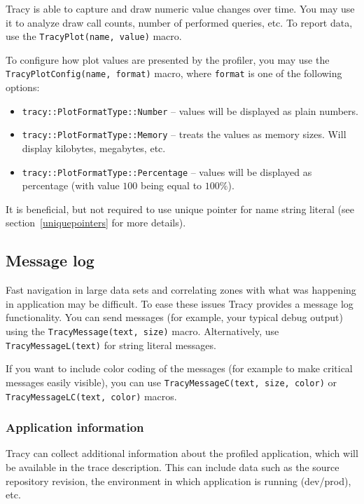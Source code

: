\documentclass[hidelinks,titlepage,a4paper]{article}
\begin{document}
Tracy is able to capture and draw numeric value changes over time. You may use it to analyze draw call counts, number of performed queries, etc. To report data, use the \texttt{TracyPlot(name, value)} macro.

To configure how plot values are presented by the profiler, you may use the \texttt{TracyPlotConfig(name, format)} macro, where \texttt{format} is one of the following options:

\begin{itemize}
\item \texttt{tracy::PlotFormatType::Number} -- values will be displayed as plain numbers.
\item \texttt{tracy::PlotFormatType::Memory} -- treats the values as memory sizes. Will display kilobytes, megabytes, etc.
\item \texttt{tracy::PlotFormatType::Percentage} -- values will be displayed as percentage (with value $100$ being equal to $100\%$).
\end{itemize}

It is beneficial, but not required to use unique pointer for name string literal (see section~\ref{uniquepointers} for more details).

\subsection{Message log}
\label{messagelog}

Fast navigation in large data sets and correlating zones with what was happening in application may be difficult. To ease these issues Tracy provides a message log functionality. You can send messages (for example, your typical debug output) using the \texttt{TracyMessage(text, size)} macro. Alternatively, use \texttt{TracyMessageL(text)} for string literal messages.

If you want to include color coding of the messages (for example to make critical messages easily visible), you can use \texttt{TracyMessageC(text, size, color)} or \texttt{TracyMessageLC(text, color)} macros.

\subsubsection{Application information}
\label{appinfo}

Tracy can collect additional information about the profiled application, which will be available in the trace description. This can include data such as the source repository revision, the environment in which application is running (dev/prod), etc.
\end{document}
